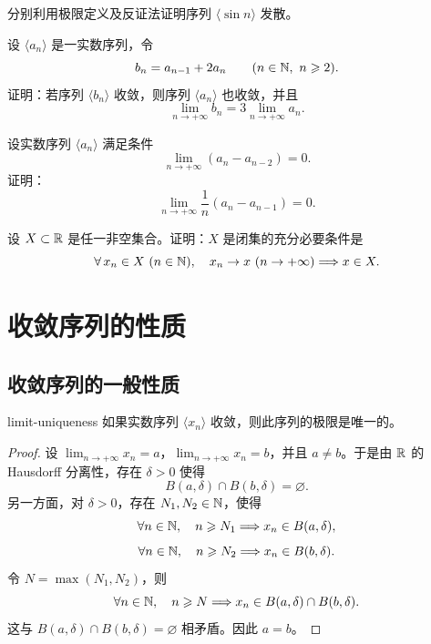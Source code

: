 \begin{exercise}
  \item 分别利用极限定义及反证法证明序列 \(\langle\sin n\rangle\) 发散。
\end{exercise}

\begin{exercise}
  \item 设 \(\langle a_n\rangle\) 是一实数序列，令
  \[
  b_n=a_{n-1}+2a_n\qquad(n\in\N,\ n\geqslant2).
  \]
  证明：若序列 \(\langle b_n\rangle\) 收敛，则序列 \(\langle a_n\rangle\) 也收敛，并且
  \[
  \lim_{n\to+\infty}b_n=3\lim_{n\to+\infty}a_n.
  \]
\end{exercise}

\begin{exercise}
  \item 设实数序列 \(\langle a_n\rangle\) 满足条件
  \[
  \lim_{n\to+\infty}(a_n-a_{n-2})=0.
  \]
  证明：
  \[
  \lim_{n\to+\infty}\frac1n(a_n-a_{n-1})=0.
  \]
\end{exercise}

\begin{exercise}
  \item 设 \(X\subset\mathbb{R}\) 是任一非空集合。证明：\(X\) 是闭集的充分必要条件是
  \[
  \forall\,x_n\in X\ (n\in\N),\quad
  x_n\to x\ (n\to+\infty)
  \Longrightarrow x\in X.
  \]
\end{exercise}

\section{收敛序列的性质}

\subsection{收敛序列的一般性质}

\begin{myproperty}{}{limit-uniqueness}
如果实数序列 \(\langle x_n\rangle\) 收敛，则此序列的极限是唯一的。
\end{myproperty}

\begin{proof}
设 \(\lim_{n\to+\infty}x_n=a\)，\(\lim_{n\to+\infty}x_n=b\)，并且 \(a\ne b\)。于是由 \(\mathbb{R}\) 的 Hausdorff 分离性，存在 \(\delta>0\) 使得
\[
B(a,\delta)\cap B(b,\delta)=\varnothing.
\]
另一方面，对 \(\delta>0\)，存在 \(N_1,N_2\in\mathbb{N}\)，使得
\[
\forall n\in\mathbb{N},\quad n\geqslant N_1\Longrightarrow x_n\in B(a,\delta),
\]
\[
\forall n\in\mathbb{N},\quad n\geqslant N_2\Longrightarrow x_n\in B(b,\delta).
\]
令 \(N=\max(N_1,N_2)\)，则
\[
\forall n\in\mathbb{N},\quad n\geqslant N
\Longrightarrow x_n\in B(a,\delta)\cap B(b,\delta).
\]
这与 \(B(a,\delta)\cap B(b,\delta)=\varnothing\) 相矛盾。因此 \(a=b\)。
\end{proof}

